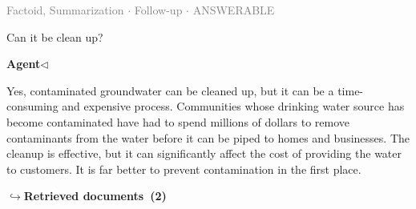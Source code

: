 \documentclass[a4paper,11pt]{article}
\begin{document}
\vspace{0.5em}
\hfill{\tiny\textcolor{gray}{Factoid, Summarization $\cdot$ Follow-up $\cdot$ ANSWERABLE}}
\begin{userbubble}
Can it be clean up?
\end{userbubble}
\noindent\hfill{\small\textcolor{agentcolor}{\textbf{Agent\enspace$\triangleleft$}}}
\begin{agentbubble}
Yes, contaminated groundwater can be cleaned up, but it can be a time-consuming and expensive process. Communities whose drinking water source has become contaminated have had to spend millions of dollars to remove contaminants from the water before it can be piped to homes and businesses. The cleanup is effective, but it can significantly affect the cost of providing the water to customers. It is far better to prevent contamination in the first place.
\end{agentbubble}
\noindent\hfill{\footnotesize\textcolor{doccolor}{\textbf{$\hookrightarrow$\enspace Retrieved documents~(2)}}}
\end{document}
